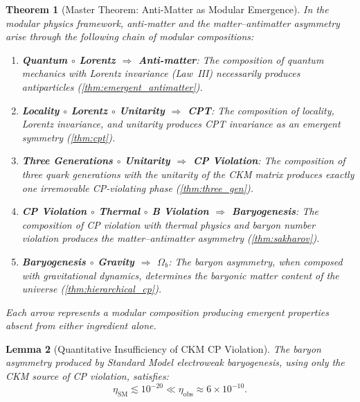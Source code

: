 \documentclass[12pt]{article}
\newtheorem{theorem}{Theorem}[section]
\newtheorem{lemma}[theorem]{Lemma}
\theoremstyle{definition}
\theoremstyle{remark}
\begin{document}
\begin{theorem}[Master Theorem: Anti-Matter as Modular Emergence]
\label{thm:master}
In the modular physics framework, anti-matter and the matter--antimatter asymmetry
arise through the following chain of modular compositions:

\begin{enumerate}
    \item \textbf{Quantum $\circ$ Lorentz $\Rightarrow$ Anti-matter}:
    The composition of quantum mechanics with Lorentz invariance (Law~III)
    necessarily produces antiparticles (\cref{thm:emergent_antimatter}).

    \item \textbf{Locality $\circ$ Lorentz $\circ$ Unitarity $\Rightarrow$ CPT}:
    The composition of locality, Lorentz invariance, and unitarity produces CPT
    invariance as an emergent symmetry (\cref{thm:cpt}).

    \item \textbf{Three Generations $\circ$ Unitarity $\Rightarrow$ CP Violation}:
    The composition of three quark generations with the unitarity of the CKM matrix
    produces exactly one irremovable CP-violating phase (\cref{thm:three_gen}).

    \item \textbf{CP Violation $\circ$ Thermal $\circ$ B Violation $\Rightarrow$ Baryogenesis}:
    The composition of CP violation with thermal physics and baryon number violation
    produces the matter--antimatter asymmetry (\cref{thm:sakharov}).

    \item \textbf{Baryogenesis $\circ$ Gravity $\Rightarrow$ $\Omega_b$}:
    The baryon asymmetry, when composed with gravitational dynamics, determines the
    baryonic matter content of the universe (\cref{thm:hierarchical_cp}).
\end{enumerate}
Each arrow represents a modular composition producing emergent properties absent
from either ingredient alone.
\end{theorem}

\begin{lemma}[Quantitative Insufficiency of CKM CP Violation]
\label{lem:ckm_insufficient}
The baryon asymmetry produced by Standard Model electroweak baryogenesis, using only
the CKM source of CP violation, satisfies:
\begin{equation}
\eta_{\text{SM}} \lesssim 10^{-20} \ll \eta_{\text{obs}} \approx 6 \times 10^{-10}.
\end{equation}
\end{lemma}
\end{document}
